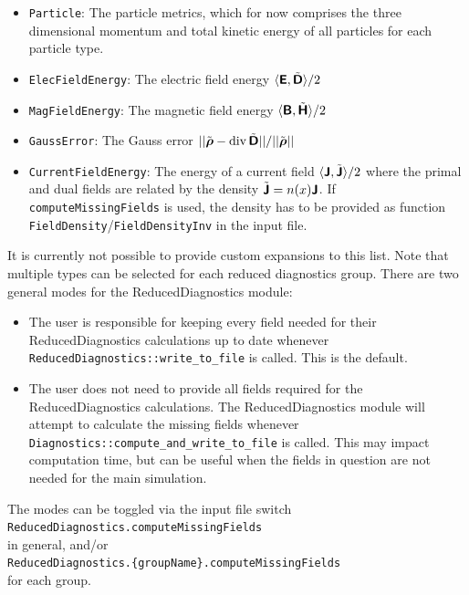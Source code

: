 \documentclass[11pt]{article}
\begin{document}
\begin{itemize}
    \item \texttt{Particle}: The particle metrics, which for now comprises the three dimensional momentum and total kinetic energy of all particles for each particle type.
    \item \texttt{ElecFieldEnergy}: The electric field energy $\langle {\boldsymbol{\rm \mathsf{E}}}, \tilde{{\boldsymbol {\rm \mathsf{D}}}}\rangle/2$
    \item \texttt{MagFieldEnergy}: The magnetic field energy $\langle {\boldsymbol{\rm \mathsf{B}}}, \tilde{{\boldsymbol {\rm \mathsf{H}}}}\rangle/2$
    \item \texttt{GaussError}: The Gauss error $||\tilde{{\boldsymbol {\rm \mathsf{\rho}}}}-\operatorname{div} \tilde{{\boldsymbol {\rm \mathsf{D}}}}||/||\tilde{{\boldsymbol {\rm \mathsf{\rho}}}}||$
    \item \texttt{CurrentFieldEnergy}: The energy of a current field $\langle {\boldsymbol{\rm \mathsf{J}}}, \tilde{{\boldsymbol {\rm \mathsf{J}}}}\rangle/2$ where the primal and dual fields are related by the density $\tilde{{\boldsymbol {\rm \mathsf{J}}}} = n(x) {\boldsymbol {\rm \mathsf{J}}}$. If \lstinline|computeMissingFields| is used, the density has to be provided as function \lstinline|FieldDensity|/\lstinline|FieldDensityInv| in the input file.
\end{itemize}
It is currently not possible to provide custom expansions to this list.
Note that multiple types can be selected for each reduced diagnostics group.
There are two general modes for the ReducedDiagnostics module:
\begin{itemize}
    \item The user is responsible for keeping every field needed for their ReducedDiagnostics calculations up to date whenever \lstinline|ReducedDiagnostics::write_to_file| is called. This is the default.
    \item The user does not need to provide all fields required for the ReducedDiagnostics calculations. The ReducedDiagnostics module will attempt to calculate the missing fields whenever \lstinline|Diagnostics::compute_and_write_to_file| is called. This may impact computation time, but can be useful when the fields in question are not needed for the main simulation.
\end{itemize}
The modes can be toggled via the input file switch
\\\lstinline|ReducedDiagnostics.computeMissingFields|\\
in general, and/or
\\\lstinline|ReducedDiagnostics.{groupName}.computeMissingFields|\\
for each group.
\end{document}
